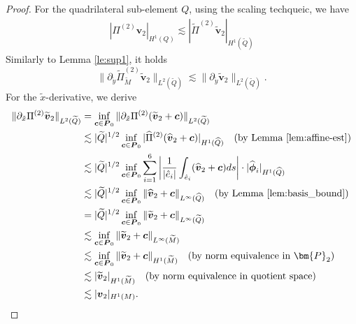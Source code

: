 \documentclass[a4paper,11pt,fleqn]{article}
\numberwithin{equation}{section}
\begin{document}
\begin{proof}
	For the quadrilateral sub-element $Q$, 	using the scaling techqueic, we have
	\begin{align*}
		|\Pi^{(2)}\boldsymbol{v}_2|_{H^1(Q)}\lesssim |\tilde{\Pi}^{(2)}\boldsymbol{\tilde{v}}_2|_{H^1(\tilde{Q})}
	\end{align*}
	Similarly to Lemma \ref{le:sup1}, it holds
	\begin{equation*}
		\|\partial_{\tilde{y}} \tilde{\Pi}^{(2)}_{\tilde{M}} \boldsymbol{\tilde{v}}_2\|_{L^2(\tilde{Q})} \lesssim \|\partial_{\tilde{y}} \boldsymbol{\tilde{v}}_2\|_{L^2(\tilde{Q})}.
	\end{equation*}
	For the $\tilde{x}$-derivative, we derive
	\begin{align*}
		\|\partial_{\tilde{x}} \Pi^{(2)} \widetilde{\boldsymbol{v}}_2\|_{L^2(\widetilde{Q})}
		&= \inf_{\boldsymbol{c} \in \boldsymbol{P}_0} \|\partial_{\tilde{x}} \Pi^{(2)} (\widetilde{\boldsymbol{v}}_2 + \boldsymbol{c})\|_{L^2(\widetilde{Q})} \\
		&\lesssim |\widetilde{Q}|^{1/2} \inf_{\boldsymbol{c} \in \boldsymbol{P}_0} | \widehat{\Pi}^{(2)} (\widehat{\boldsymbol{v}}_2 + \boldsymbol{c})|_{H^1(\widehat{Q})} \quad \text{(by Lemma \ref{lem:affine-est})} \\
		&\lesssim |\widetilde{Q}|^{1/2} \inf_{\boldsymbol{c} \in \boldsymbol{P}_0} \sum_{i=1}^{6} \left| \frac{1}{|\hat{e}_i|} \int_{\hat{e}_i} (\widehat{\boldsymbol{v}}_2 + \boldsymbol{c}) ds \right| \cdot | \widehat{\boldsymbol{\phi}}_i|_{H^1(\widehat{Q})} \\
		&\lesssim |\widetilde{Q}|^{1/2} \inf_{\boldsymbol{c} \in \boldsymbol{P}_0} \| \widehat{\boldsymbol{v}}_2 + \boldsymbol{c} \|_{L^{\infty}(\widehat{Q})} \quad \text{(by Lemma \ref{lem:basis_bound})} \\
		&= |\widetilde{Q}|^{1/2} \inf_{\boldsymbol{c} \in \boldsymbol{P}_0} \| \widetilde{\boldsymbol{v}}_2 + \boldsymbol{c} \|_{L^{\infty}(\widetilde{Q})} \\
		&\lesssim \inf_{\boldsymbol{c} \in \boldsymbol{P}_0} \| \widetilde{\boldsymbol{v}}_2 + \boldsymbol{c} \|_{L^{\infty}(\widetilde{M})} \\
		&\lesssim \inf_{\boldsymbol{c} \in \boldsymbol{P}_0} \| \widetilde{\boldsymbol{v}}_2 + \boldsymbol{c} \|_{H^1(\widetilde{M})} 
		\quad \text{(by norm equivalence in $\bm{P}_2$)} \\
		&\lesssim | \widetilde{\boldsymbol{v}}_2 |_{H^1(\widetilde{M})} \quad \text{(by norm equivalence in quotient space)} \\
		&\lesssim | \boldsymbol{v}_2 |_{H^1(M)}.
	\end{align*}
	

\end{proof}
\end{document}

